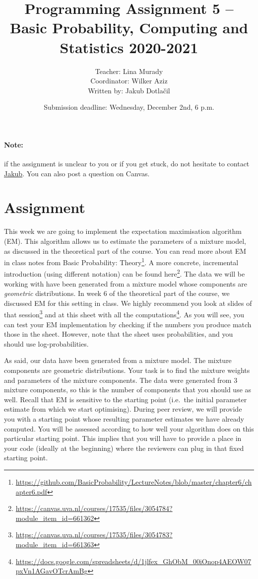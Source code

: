 \documentclass[11pt, a4paper]{article}
\title{Programming Assignment 5 -- Basic Probability, Computing and Statistics 2020-2021}
\author{Teacher: Lina Murady \\
  Coordinator: Wilker Aziz \\
  Written by: Jakub Dotla\v{c}il}
\date{Submission deadline: Wednesday, December 2nd, 6 p.m.}
\newcommand{\link}[1]{\footnote{\color{blue}\href{#1}{#1}}}
\begin{document}
\maketitle

\paragraph{Note:} if the assignment is unclear to you or if you get stuck, do not hesitate to contact \href{mailto:j.dotlacil@uva.nl}{Jakub}. You can also post a question on Canvas.

\section{Assignment}

This week we are going to implement the expectation maximisation algorithm (EM). 
This algorithm allows us to estimate the parameters of a mixture model, as discussed in the theoretical part of the course.
You can read more about EM in class notes from Basic Probability: Theory\link{https://github.com/BasicProbability/LectureNotes/blob/master/chapter6/chapter6.pdf}. 
A more concrete, incremental introduction (using different notation) can be found here\footnote{\href{https://canvas.uva.nl/courses/17535/files/3054784?module_item_id=661362}{https://canvas.uva.nl/courses/17535/files/3054784?module\_item\_id=661362}}.
The data we will be working with have been generated from a mixture model whose components are \emph{geometric} distributions.
In week 6 of the theoretical part of the course, we discussed EM for this setting in class. 
We highly recommend you look at slides of that session\footnote{\href{https://canvas.uva.nl/courses/17535/files/3054783?module_item_id=661363}{https://canvas.uva.nl/courses/17535/files/3054783?module\_item\_id=661363}} and  at this sheet with all the computations\footnote{\href{https://docs.google.com/spreadsheets/d/1jlfex_GhObM_00iOnop4AEOW07pxVn1AGavOTcrAmBg}{https://docs.google.com/spreadsheets/d/1jlfex\_GhObM\_00iOnop4AEOW07pxVn1AGavOTcrAmBg}}.
As you will see, you can test your EM implementation by checking if the numbers you produce match those in the sheet. 
However, note that the sheet uses probabilities, and you should use log-probabilities.



As said, our data have been generated from a mixture model. 
 The mixture components are geometric distributions. 
 Your task is to find the mixture weights and parameters of the mixture components. 
 The data were generated from 3 mixture components, so this is the number of components that you should use as well. 
Recall that EM is sensitive to the starting point (i.e.\ the initial parameter estimate from which we start optimising). During peer review, we will
provide you with a starting point whose resulting parameter estimates we have already computed. You will be assessed according to how well your
algorithm does on this particular starting point. This implies that you will have to provide a place in your code (ideally at the beginning) where
the reviewers can plug in that fixed starting point.
\end{document}
